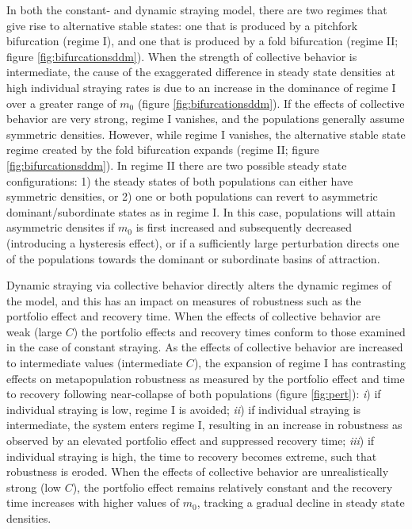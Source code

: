 \documentclass{revtex4}
\begin{document}
In both the constant- and dynamic straying model, there are two regimes that give rise to alternative stable states: one that is produced by a pitchfork bifurcation (regime I), and one that is produced by a fold bifurcation (regime II; figure \ref{fig:bifurcationsddm}).
When the strength of collective behavior is intermediate, the cause of the exaggerated difference in steady state densities at high individual straying rates is due to an increase in the dominance of regime I over a greater range of $m_0$ (figure \ref{fig:bifurcationsddm}).
If the effects of collective behavior are very strong, regime I vanishes, and the populations generally assume symmetric densities.
However, while regime I vanishes, the alternative stable state regime created by the fold bifurcation expands (regime II; figure \ref{fig:bifurcationsddm}).
In regime II there are two possible steady state configurations: 
1) the steady states of both populations can either have symmetric densities, or 
2) one or both populations can revert to asymmetric dominant/subordinate states as in regime I.
In this case, populations will attain asymmetric densites if $m_0$ is first increased and subsequently decreased (introducing a hysteresis effect), or if a sufficiently large perturbation directs one of the populations towards the dominant or subordinate basins of attraction.



Dynamic straying via collective behavior directly alters the dynamic regimes of the model, and this has an impact on measures of robustness such as the portfolio effect and recovery time.
When the effects of collective behavior are weak (large $C$) the portfolio effects and recovery times conform to those examined in the case of constant straying.
As the effects of collective behavior are increased to intermediate values (intermediate $C$), the expansion of regime I has contrasting effects on metapopulation robustness as measured by the portfolio effect and time to recovery following near-collapse of both populations (figure \ref{fig:pert}):
\emph{i}) if individual straying is low, regime I is avoided;
\emph{ii}) if individual straying is intermediate, the system enters regime I, resulting in an increase in robustness as observed by an elevated portfolio effect and suppressed recovery time;
\emph{iii}) if individual straying is high, the time to recovery becomes extreme, such that robustness is eroded.
When the effects of collective behavior are unrealistically strong (low $C$), the portfolio effect remains relatively constant and the recovery time increases with higher values of $m_0$, tracking a gradual decline in steady state densities.
\end{document}
